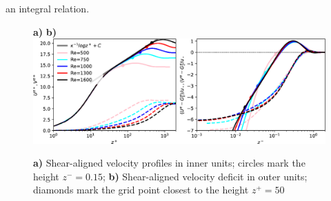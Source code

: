\documentclass[smallcondensed,final]{svjour3}
\begin{document}
an integral relation. 
%
\par
%
\begin{figure}
  \begin{flushleft}
    \textbf{a)}\hspace{0.47\textwidth} \textbf{b)}\\
    \includegraphics[width=\textwidth]{Fig1.eps}\\ %
    \caption{
      \textbf{a)} Shear-aligned velocity profiles in inner units; circles mark the
      height $z^-=0.15$;
      \textbf{b)} Shear-aligned velocity deficit in outer units; diamonds mark the grid point closest to the height $z^+=50$
      \label{fig:profiles}
    }
  \end{flushleft}
\end{figure}
\end{document}
